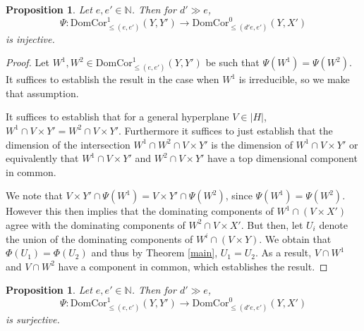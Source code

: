 \documentclass[12pt]{amsart}
\numberwithin{equation}{section}
\newtheorem{proposition}[theorem]{Proposition}
\numberwithin{theorem}{section}
\theoremstyle{definition}
\theoremstyle{definition}
\def\NN{{\mathbb N}}
\def \DC{{\mathrm{DomCor}}}
\begin{document}
\begin{proposition}
    Let $e,e' \in \NN$. Then for $d' \gg e $, $$\Psi: \DC^1_{\le(e,e')}(Y, Y') \to \DC^0_{\le (d'e,e')}(Y, X')$$ is injective.
\end{proposition}
\begin{proof}
    Let $W^1, W^2 \in \DC^1_{\le (e,e')}(Y,Y')$ be such that $\Psi(W^1) = \Psi(W^2)$. It suffices to establish the result in the case when $W^1$ is irreducible, so we make that assumption.

     It suffices to establish that for a general hyperplane $V \in |H|$, $ W^1 \cap V \times Y' = W^2 \cap V \times Y'$. Furthermore it suffices to just  establish that the dimension of the intersection $W^1 \cap W^2 \cap V \times Y'$ is the dimension of $W^1 \cap V \times Y'$ or equivalently that $W^1 \cap V \times Y'$ and $W^2 \cap V \times Y'$ have a top dimensional component in common.

     We note that $V \times Y' \cap \Psi(W^1) = V \times Y' \cap \Psi(W^2)$, since $\Psi(W^1) = \Psi(W^2)$. However this then implies that the dominating components of $W^1 \cap (V \times X')$ agree with the dominating components of $W^2 \cap V \times X'$. But then, let $U_i$ denote the union of the dominating components of $ W^i \cap (V \times Y).$ We obtain that $\Phi(U_1) = \Phi(U_2)$ and thus by Theorem \ref{main}, $U_1 = U_2.$ As a result, $V \cap W^1$ and $V \cap W^2$ have a component in common,  which establishes the result.
\end{proof}
\begin{proposition}
 Let $e,e' \in \NN$. Then for $d' \gg e $, $$\Psi: \DC^1_{\le(e,e')}(Y, Y') \to \DC^0_{\le (d'e,e')}(Y, X')$$ is surjective.
\end{proposition}
\end{document}

